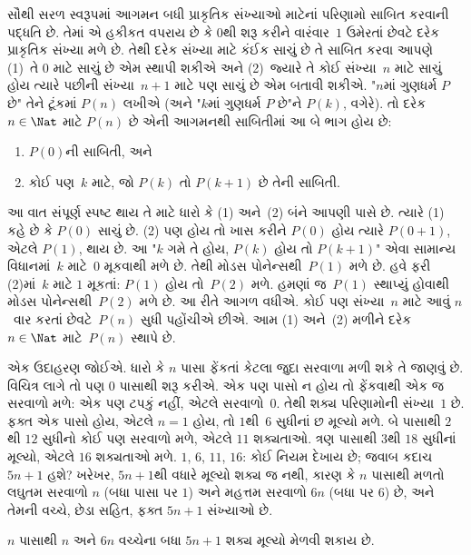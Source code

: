 \documentclass[../../../include/open-logic-section]{subfiles}
\begin{document}


સૌથી સરળ સ્વરૂપમાં આગમન બધી પ્રાકૃતિક સંખ્યાઓ માટેનાં પરિણામો
સાબિત કરવાની પદ્ધતિ છે. તેમાં એ હકીકત વપરાય છે કે $0$થી શરૂ
કરીને વારંવાર~$1$ ઉમેરતાં છેવટે દરેક પ્રાકૃતિક સંખ્યા મળે છે.
તેથી દરેક સંખ્યા માટે કંઈક સાચું છે તે સાબિત કરવા આપણે
(1)~તે $0$ માટે સાચું છે એમ સ્થાપી શકીએ અને (2)~જ્યારે તે
કોઈ સંખ્યા~$n$ માટે સાચું હોય ત્યારે પછીની સંખ્યા~$n+1$
માટે પણ સાચું છે એમ બતાવી શકીએ. "$n$માં ગુણધર્મ $P$ છે"
તેને ટૂંકમાં $P(n)$ લખીએ (અને "$k$માં ગુણધર્મ $P$ છે"ને
$P(k)$, વગેરે). તો દરેક $n \in \Nat$ માટે $P(n)$ છે એની
આગમનથી સાબિતીમાં આ બે ભાગ હોય છે:
\begin{enumerate}
\item $P(0)$ની સાબિતી, અને
\item કોઈ પણ~$k$ માટે, જો $P(k)$ તો $P(k+1)$ છે તેની સાબિતી.
\end{enumerate}
આ વાત સંપૂર્ણ સ્પષ્ટ થાય તે માટે ધારો કે (1) અને~(2) બંને
આપણી પાસે છે. ત્યારે (1) કહે છે કે $P(0)$ સાચું છે. (2) પણ
હોય તો ખાસ કરીને $P(0)$ હોય ત્યારે $P(0+1)$, એટલે $P(1)$,
થાય છે. આ "$k$ ગમે તે હોય, $P(k)$ હોય તો $P(k+1)$" એવા
સામાન્ય વિધાનમાં~$k$ માટે~$0$ મૂકવાથી મળે છે. તેથી
મોડસ પોનેન્સથી~$P(1)$ મળે છે. હવે ફરી (2)માં~$k$ માટે
$1$ મૂકતાં: $P(1)$ હોય તો~$P(2)$ મળે. હમણાં જ~$P(1)$
સ્થાપ્યું હોવાથી મોડસ પોનેન્સથી~$P(2)$ મળે છે. આ રીતે
આગળ વધીએ. કોઈ પણ સંખ્યા~$n$ માટે આવું $n$~વાર કરતાં
છેવટે~$P(n)$ સુધી પહોંચીએ છીએ. આમ (1) અને~(2) મળીને
દરેક $n \in \Nat$ માટે~$P(n)$ સ્થાપે છે.

એક ઉદાહરણ જોઈએ. ધારો કે $n$ પાસા ફેંકતાં કેટલા જુદા
સરવાળા મળી શકે તે જાણવું છે. વિચિત્ર લાગે તો પણ $0$ પાસાથી
શરૂ કરીએ. એક પણ પાસો ન હોય તો ફેંકવાથી એક જ સરવાળો મળે:
એક પણ ટપકું નહીં, એટલે સરવાળો~$0$. તેથી શક્ય પરિણામોની
સંખ્યા~$1$ છે. ફક્ત એક પાસો હોય, એટલે $n=1$ હોય, તો
$1$થી~$6$ સુધીનાં છ મૂલ્યો મળે. બે પાસાથી $2$થી $12$
સુધીનો કોઈ પણ સરવાળો મળે, એટલે $11$ શક્યતાઓ. ત્રણ
પાસાથી $3$થી $18$ સુધીનાં મૂલ્યો, એટલે $16$ શક્યતાઓ
મળે. $1$, $6$, $11$, $16$: કોઈ નિયમ દેખાય છે; જવાબ
કદાચ $5n+1$ હશે? ખરેખર, $5n+1$થી વધારે મૂલ્યો શક્ય જ
નથી, કારણ કે $n$ પાસાથી મળતો લઘુતમ સરવાળો $n$ (બધા
પાસા પર $1$) અને મહત્તમ સરવાળો $6n$ (બધા પર $6$) છે,
અને તેમની વચ્ચે, છેડા સહિત, ફક્ત $5n+1$ સંખ્યાઓ છે.

\begin{thm}
  $n$ પાસાથી $n$ અને $6n$ વચ્ચેના બધા $5n+1$ શક્ય મૂલ્યો
  મેળવી શકાય છે.
\end{thm}
\end{document}
